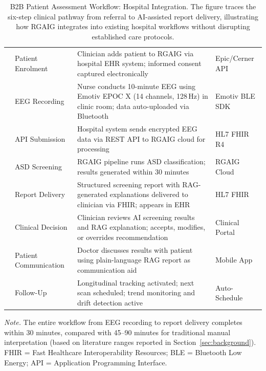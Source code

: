 \begin{table}[!htbp]
\tablestripes\tablefontsize
\tablefontsize
\caption[B2B Patient Assessment Workflow: Hospital Integration]{B2B Patient Assessment Workflow: Hospital Integration. The figure traces the six-step clinical pathway from referral to AI-assisted report delivery, illustrating how RGAIG integrates into existing hospital workflows without disrupting established care protocols.}
\begin{tabularx}{\textwidth}{@{} >{\raggedright\arraybackslash}p{0.6cm} >{\raggedright\arraybackslash}p{3.0cm} L >{\raggedright\arraybackslash}p{2.5cm} @{}}
\toprule
\thead{\#} &  &  &  \\
 & Patient Enrolment & Clinician adds patient to RGAIG via hospital EHR system; informed consent captured electronically & Epic/Cerner API \\
 & EEG Recording & Nurse conducts 10-minute EEG using Emotiv EPOC X (14 channels, 128\,Hz) in clinic room; data auto-uploaded via Bluetooth & Emotiv BLE SDK \\
 & API Submission & Hospital system sends encrypted EEG data via REST API to RGAIG cloud for processing & HL7 FHIR R4 \\
 & ASD Screening & RGAIG pipeline runs ASD classification; results generated within 30 minutes & RGAIG Cloud \\
 & Report Delivery & Structured screening report with RAG-generated explanations delivered to clinician via FHIR; appears in EHR & HL7 FHIR \\
 & Clinical Decision & Clinician reviews AI screening results and RAG explanation; accepts, modifies, or overrides recommendation & Clinical Portal \\
 & Patient Communication & Doctor discusses results with patient using plain-language RAG report as communication aid & Mobile App \\
 & Follow-Up & Longitudinal tracking activated; next scan scheduled; trend monitoring and drift detection active & Auto-Schedule \\
\bottomrule
\end{tabularx}
\vspace{0.5em}
\noindent\textit{Note.} The entire workflow from EEG recording to report delivery completes within 30 minutes, compared with 45--90 minutes for traditional manual interpretation (based on literature ranges reported in Section~\ref{sec:background}). FHIR = Fast Healthcare Interoperability Resources; BLE = Bluetooth Low Energy; API = Application Programming Interface.
\end{table}
\fi




